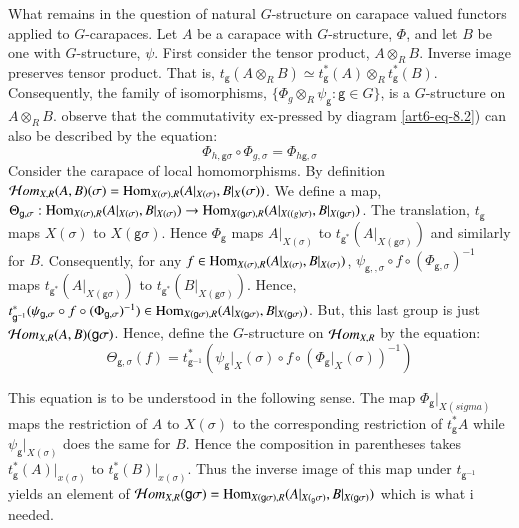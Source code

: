 What remains in the question of natural $G$-structure on carapace valued functors applied to $G$-carapaces. Let $A$ be a carapace with $G$-structure, $\Phi$, and let $B$ be one with $G$-structure, $\psi$. First consider the tensor product, $A \otimes_{R}B$. Inverse image preserves tensor product. That is, $t_{\mathsf{g}}(A \otimes_{R}B)\simeq t_{\mathsf{g}}^{*}(A)\otimes_{R} t_{\mathsf{g}}^{*}(B)$. Consequently, the family of isomorphisms, $\{\Phi_{g} \otimes_{R} \psi_{\mathsf{g}} : \mathsf{g} \in G \}$, is a $G$-structure on $A \otimes_{R} B$. observe that the commutativity ex-pressed by diagram \ref{art6-eq-8.2}) can also be described by the equation:
\begin{equation}\label{art6-eq-8.5}
\Phi_{h,\mathsf{g}\sigma} \circ \Phi_{g, \sigma} = \Phi_{h \mathsf{g}, \sigma}
\end{equation}
Consider the carapace of local homomorphisms. By definition\break $\mathcal{H} om_{X,R}(A, B)(\sigma) = \operatorname{Hom}_{X(\sigma), R}(A|_{X(\sigma)}, B|_{X}(\sigma))$. We define a map, $\Theta_{\mathsf{g}, \sigma} : \operatorname{Hom}_{X (\sigma),R}(A|_{X(\sigma)}, B|_{X(\sigma)})\rightarrow \operatorname{Hom}_{X(\mathsf{g}\sigma),R}(A|_{X(\mathsf(g)\sigma)}, B|_{X(\mathsf{g}\sigma)})$. The translation, $t_{\mathsf{g}}$ maps $X(\sigma)$ to $X(\mathsf{g}\sigma)$. Hence $\Phi_{\mathsf{g}}$ maps $A|_{X(\sigma)}$ to 
$t_{\mathsf{g}^{*}}(A|_{X(\mathsf{g}\sigma)})$ and similarly for $B$. Consequently, for any $f \in \operatorname{Hom}_{X(\sigma),R}(A|_{X(\sigma)}, B|_{X(\sigma)})$, $\psi_{\mathsf{g},,\sigma} \circ f \circ (\Phi_{\mathsf{g}, \sigma})^{-1}$ maps $t_{\mathsf{g}^{*}}(A|_{X(\mathsf{g}\sigma)})$ to $t_{\mathsf{g}^{*}}(B|_{X(\mathsf{g}\sigma)})$. Hence, $t_{\mathsf{g}^{-1}}^{*}(\psi_{\mathsf{g}, \sigma} \circ f \circ (\Phi_{\mathsf{g},\sigma})^{-1}) \in \operatorname{Hom}_{X(\mathsf{g}\sigma), R}(A|_{X(\mathsf{g}\sigma)}, B|_{X(\mathsf{g}\sigma)})$. But, this last group is just $\mathcal{H} om_{X, R}(A, B)(\mathsf{g}\sigma)$. Hence, define the $G$-structure on $\mathcal{H} om_{X, R}$ by the equation:
\begin{equation}\label{art6-eq-8.6}
\Theta_{\mathsf{g}, \sigma}(f) = t_{\mathsf{g}^{-1}}^{*}(\psi_{\mathsf{g}}|_{X}({\sigma}) \circ f \circ (\Phi_{\mathsf{g}}|_{X}{(\sigma)})^{-1})
\end{equation} 

This equation is to be understood in the following sense. The map $\Phi_{\mathsf{g}}|_{X(sigma)}$ maps the restriction of $A$ to $X(\sigma)$ to the corresponding restriction of $t_{\mathsf{g}}^{*} A$ while $\psi_{\mathsf{g}}|_{X(\sigma)}$ does the same for $B$. Hence the composition in parentheses takes $t_{\mathsf{g}}^{*}(A)|_{x(\sigma)}$ to $t_{\mathsf{g}}^{*}(B)|_{x(\sigma)}$. Thus the inverse image of this map under $t_{\mathsf{g}^{-1}}$ yields an element of $\calH om_{X, R}(\mathsf{g}\sigma) = \Hom_{X(\mathsf{g}\sigma), R}\break (A|_{X(_\mathsf{g}\sigma)}, B|_{X(\mathsf{g}\sigma)})$ which is what i needed.

